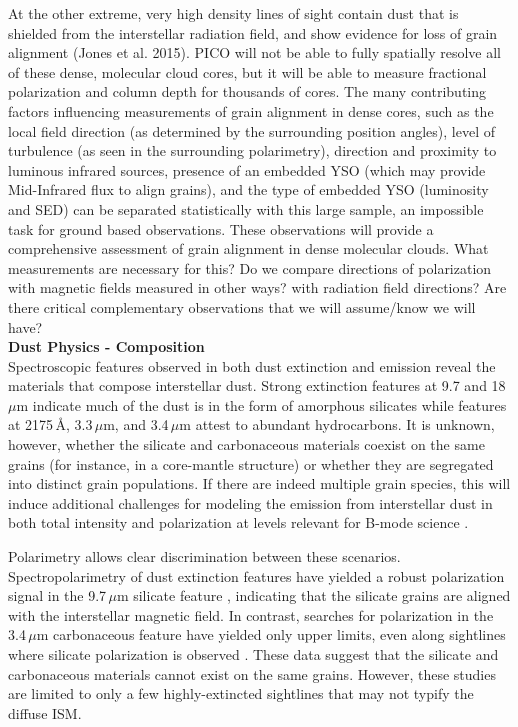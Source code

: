 \documentclass[PICOReport.tex]{subfiles}
\begin{document}
At the other extreme, very high density lines of sight contain dust that is shielded from the interstellar radiation field, and show evidence for loss of grain alignment \citep{Goodman1995}(Jones et al. 2015). PICO will not be able to fully spatially resolve all of these dense, molecular cloud cores, but it will be able to measure fractional polarization and column depth for thousands of cores. The many contributing factors influencing measurements of grain alignment in dense cores, such as the local field direction (as determined by the surrounding position angles), level of turbulence (as seen in the surrounding polarimetry), direction and proximity to luminous infrared sources, presence of an embedded YSO (which may provide Mid-Infrared flux to align grains), and the type of embedded YSO (luminosity and SED) can be separated statistically with this large sample, an impossible task for ground based observations. These observations will provide a comprehensive assessment of grain alignment in dense molecular clouds. {\color{red} What measurements are necessary for this? Do we compare directions of polarization with magnetic fields measured in other ways? with radiation field directions? Are there critical complementary observations that we will assume/know we will have?} \\

{\bf Dust Physics - Composition} \\[0.3cm]
Spectroscopic features observed in both dust extinction and emission reveal the materials that compose interstellar dust. Strong extinction features at 9.7 and 18\,$\mu$m indicate much of the dust is in the form of amorphous silicates while features at 2175\,\AA, 3.3\,$\mu$m, and 3.4\,$\mu$m attest to abundant hydrocarbons. It is unknown, however, whether the silicate and carbonaceous materials coexist on the same grains (for instance, in a core-mantle structure) or whether they are segregated into distinct grain populations. If there are indeed multiple grain species, this will induce additional challenges for modeling the emission from interstellar dust in both total intensity and polarization at levels relevant for B-mode science \citep{Hensley2018}.

Polarimetry allows clear discrimination between these scenarios. Spectropolarimetry of dust extinction features have yielded a robust polarization signal in the 9.7\,$\mu$m silicate feature \citep[e.g.,][]{Smith2000}, indicating that the silicate grains are aligned with the interstellar magnetic field. In contrast, searches for polarization in the 3.4\,$\mu$m carbonaceous feature have yielded only upper limits, even along sightlines where silicate polarization is observed \citep{Chiar2006,Mason2007}. These data suggest that the silicate and carbonaceous materials cannot exist on the same grains. However, these studies are limited to only a few highly-extincted sightlines that may not typify the diffuse ISM.
\end{document}
